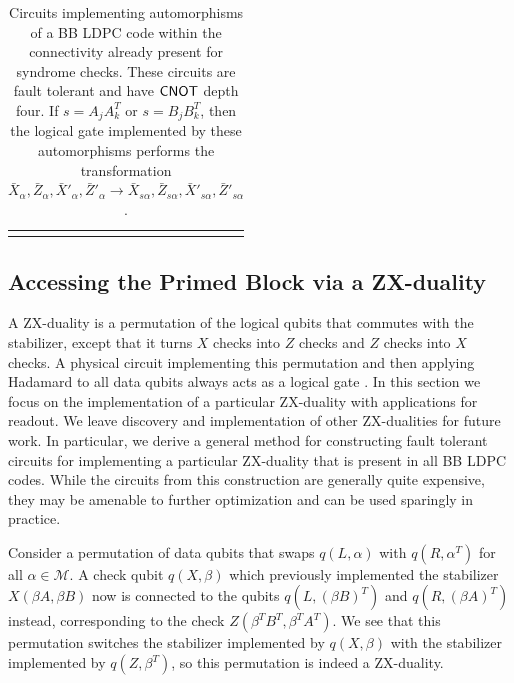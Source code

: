 \documentclass{article}
\begin{document}
\begin{table}[t]
\begin{center}
\begin{tabular}{cc}
{\begin{minipage}{7cm}
\begin{algorithmic}
	\EndFor
	\State{}
	\end{algorithmic}
\end{minipage}}
 \\ 
\end{tabular}
\end{center}
\caption{\label{table:automorphisms} Circuits implementing automorphisms of a BB LDPC code within the connectivity already present for syndrome checks. These circuits are fault tolerant and have $\mathsf{CNOT}$ depth four. If $s = A_j A_k^T$ or $s = B_j B_k^T$, then the logical gate implemented by these automorphisms performs the transformation $\bar X_\alpha, \bar Z_\alpha, \bar X'_\alpha, \bar Z'_\alpha \to \bar X_{s\alpha}, \bar Z_{s\alpha}, \bar X'_{s\alpha}, \bar Z'_{s\alpha}$.}
\end{table}

\subsection{Accessing the Primed Block via a ZX-duality}
\label{ssec:ZX_duality}
 
A ZX-duality is a permutation of the logical qubits that commutes with the stabilizer, except that it turns $X$ checks into $Z$ checks and $Z$ checks into $X$ checks. A physical circuit implementing this permutation and then applying Hadamard to all data qubits always acts as a logical gate \cite{breuckmann2022foldtransversal}. In this section we focus on the implementation of a particular ZX-duality with applications for readout. We leave discovery and implementation of other ZX-dualities for future work. In particular, we derive a general method for constructing fault tolerant circuits for implementing a particular ZX-duality that is present in all BB LDPC codes. While the circuits from this construction are generally quite expensive, they may be amenable to further optimization and can be used sparingly in practice.


Consider a permutation of data qubits that swaps $q(L,\alpha)$ with $q(R,\alpha^{T})$ for all $\alpha \in \mathcal{M}$. A check qubit $q(X,\beta)$ which previously implemented the stabilizer $X(\beta A, \beta B )$ now is connected to the qubits $q(L, (\beta B)^T)$ and $q(R,(\beta A)^T)$ instead, corresponding to the check $Z(\beta^T B^T , \beta^T A^T)$. We see that this permutation switches the stabilizer implemented by $q(X,\beta)$ with the stabilizer implemented by $q(Z,\beta^T)$, so this permutation is indeed a ZX-duality.
\end{document}
